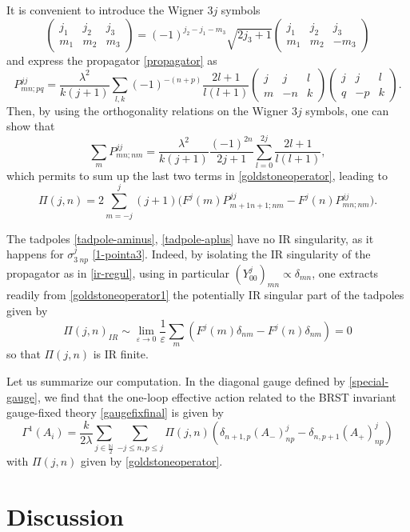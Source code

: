 \documentclass[a4paper,11pt]{article}
\numberwithin{equation}{section}
\newcommand{\cg}[6]{
  \left(
  \begin{array}{cc|c}
  #1 & #3 & #5 \\
  #2 & #4 & #6
  \end{array}
  \right)
}
\newcommand{\wign}[6]{
\left(
  \begin{array}{ccc}
  #1 & #3 & #5 \\
  #2 & #4 & #6
  \end{array}
  \right)
}
\theoremstyle{nonumberplain}
\begin{document}
It is convenient to introduce the Wigner $3j$ symbols
\begin{equation}
\cg{j_1}{m_1}{j_2}{m_2}{j_3}{m_3}=(-1)^{j_2-j_1-m_3}{\sqrt{2j_3+1}}\wign{j_1}{m_1}{j_2}{m_2}{j_3}{-m_3}\label{cg-wign}
\end{equation}
and express the propagator \eqref{propagator} as
\begin{equation}
P^{jj}_{mn;pq}=\frac{\lambda^2}{k(j+1)}\sum_{l,k}(-1)^{-(n+p)}\frac{2l+1}{l(l+1)}\wign{j}{m}{j}{-n}{l}{k}\wign{j}{q}{j}{-p}{l}{k}\label{practice-propa}.
\end{equation}
Then, by using the orthogonality relations on the Wigner $3j$ symbols, one can show that
\begin{equation}
\sum_{m}P^{jj}_{mn;nm}=\frac{\lambda^2}{k(j+1)}\frac{(-1)^{2n}}{2j+1}\sum_{l=0}^{2j}\frac{2l+1}{l(l+1)}\label{sum-boundary},
\end{equation}
which permits to sum up the last two terms in \eqref{goldstoneoperator}, leading to
\begin{equation}
\Pi(j,n)=2\sum_{m=-j}^j(j+1)\big(F^j(m)P^{jj}_{m+1n+1;nm}-F^j(n)P^{jj}_{mn;nm}\big)\label{goldstoneoperator1}.
\end{equation}

The tadpoles \eqref{tadpole-aminus}, \eqref{tadpole-aplus} have no IR singularity, as it happens for $\sigma^{j}_{3\ np}$ \eqref{1-pointa3}. Indeed, by isolating the IR singularity of the propagator as in \eqref{ir-regul}, using in particular $(Y^j_{00})_{mn}\varpropto\delta_{mn}$, one extracts readily from \eqref{goldstoneoperator1} the potentially IR singular part of the tadpoles given by
\begin{equation}
\Pi(j,n)_{IR}\sim\lim_{\varepsilon\to0}\frac{1}{\varepsilon}\sum_m(F^j(m)\delta_{nm}-F^j(n)\delta_{nm})=0
\end{equation}
so that $\Pi(j,n)$ is IR finite.\par 

Let us summarize our computation. In the diagonal gauge defined by \eqref{special-gauge}, we find that the one-loop effective action related to the BRST invariant gauge-fixed theory \eqref{gaugefixfinal} is given by
\begin{equation}
\Gamma^1(A_i)=\frac{k}{2\lambda}\sum_{j\in\frac{\mathbb{N}}{2}}\sum_{-j\le n,p\le j}\Pi(j,n)(\delta_{n+1,p}(A_-)^j_{np}-\delta_{n,p+1}(A_+)^j_{np})\label{effective-lin}
\end{equation}
with $\Pi(j,n)$ given by \eqref{goldstoneoperator}.

\section{Discussion}\label{discussion}
\end{document}

